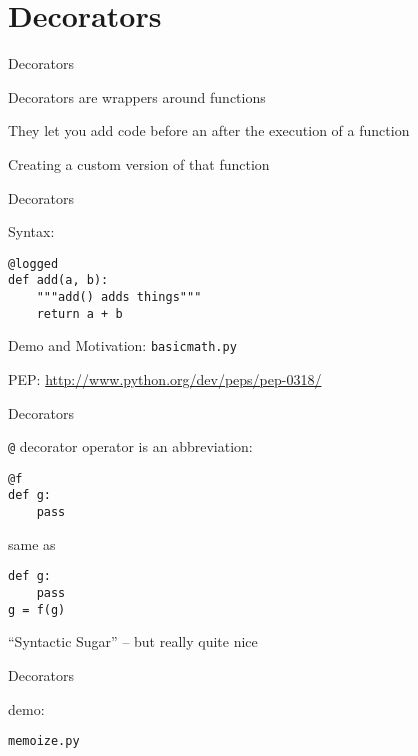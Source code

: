 \documentclass{beamer}
\begin{document}
\section{Decorators}

\begin{frame}[fragile]{Decorators}

{\LARGE Decorators are wrappers around functions}

\vfill
{\LARGE They let you add code before an after the execution of a function}

\vfill
{\LARGE Creating a custom version of that function}

\end{frame} 

\begin{frame}[fragile]{Decorators}

{\LARGE Syntax:}

\vfill
\begin{verbatim}
@logged
def add(a, b):
    """add() adds things"""
    return a + b
\end{verbatim}

\vfill
{\Large Demo and Motivation: \verb|basicmath.py| }

\vfill
PEP: \url{http://www.python.org/dev/peps/pep-0318/}

\end{frame} 

\begin{frame}[fragile]{Decorators}

{\LARGE \verb|@| decorator operator is an abbreviation:}

\vfill
\begin{verbatim}
@f
def g:
    pass
\end{verbatim}

\vfill
same as

\vfill
\begin{verbatim}
def g:
    pass
g = f(g)
\end{verbatim}

\vfill
{\Large ``Syntactic Sugar'' -- but really quite nice}

\end{frame} 

\begin{frame}[fragile]{Decorators}

{\LARGE demo:

\vfill
\begin{verbatim}
memoize.py
\end{verbatim}

}
\end{frame} 
\end{document}
